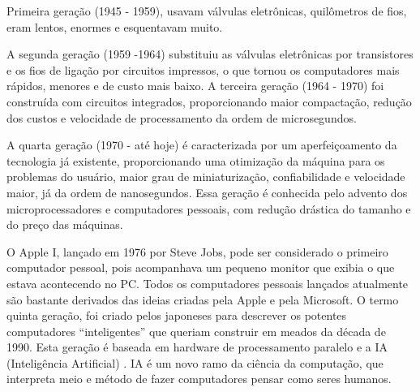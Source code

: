 \documentclass[
	12pt,				%
	openright,			%
	twoside,			%
	a4paper,			%
	english,			%
	french,				%
	spanish,			%
	brazil,				%
	]{abntex2}
\begin{document}
Primeira geração (1945 - 1959), usavam válvulas eletrônicas, quilômetros de fios, eram lentos, enormes e esquentavam muito.
\par
A segunda geração (1959 -1964) substituiu as válvulas eletrônicas por transistores e os fios de ligação por circuitos impressos, o que tornou os computadores mais rápidos, menores e de custo mais baixo.
A terceira geração (1964 - 1970) foi construída com circuitos integrados, proporcionando maior compactação, redução dos custos e velocidade de processamento da ordem de microsegundos.
\par
A quarta geração (1970 - até hoje) é caracterizada por um aperfeiçoamento da tecnologia já existente, proporcionando uma otimização da máquina para os problemas do usuário, maior grau de miniaturização, confiabilidade e velocidade maior, já da ordem de nanosegundos. Essa geração é conhecida pelo advento dos microprocessadores e computadores pessoais, com redução drástica do tamanho e do preço das máquinas.
\par
O Apple I, lançado em 1976 por Steve Jobs, pode ser considerado o primeiro computador pessoal, pois acompanhava um pequeno monitor que exibia o que estava acontecendo no PC. Todos os computadores pessoais lançados atualmente são bastante derivados das ideias criadas pela Apple e pela Microsoft.
O termo quinta geração, foi criado pelos japoneses para descrever os potentes computadores “inteligentes” que queriam construir em meados da década de 1990. Esta geração é baseada em hardware de processamento paralelo e a IA (Inteligência Artificial) . IA é um novo ramo da ciência da computação, que interpreta meio e método de fazer computadores pensar como seres humanos.




\end{document}
